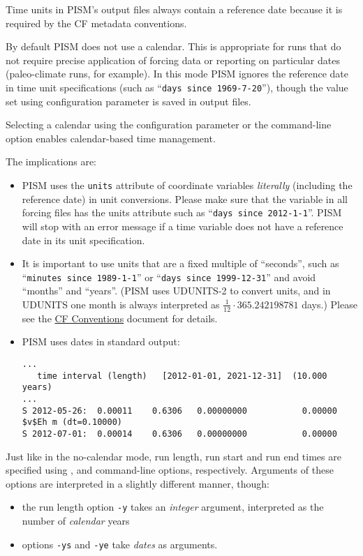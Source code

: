 Time units in PISM's output files always contain a reference date
because it is required by the CF metadata conventions.

By default PISM does not use a calendar. This is appropriate for runs that
do not require precise application of forcing data or reporting on
particular dates (paleo-climate runs, for example).
In this mode PISM ignores the reference date in time unit specifications
(such as ``\texttt{days since 1969-7-20}''), though the value set using
 configuration parameter is saved in
output files.

Selecting a calendar using the  configuration
parameter or the  command-line option enables calendar-based time management.

The implications are:
\begin{itemize}
\item PISM uses the \texttt{units} attribute of coordinate variables
  \emph{literally} (including the reference date) in unit conversions. Please
  make sure that the  variable in all forcing files has the
  units attribute such as ``\texttt{days since 2012-1-1}''. PISM will stop with
  an error message if a time variable does not have a reference date in its
  unit specification.
\item It is important to use units that are a fixed multiple of ``seconds'',
  such as ``\texttt{minutes since 1989-1-1}'' or ``\texttt{days since
    1999-12-31}'' and avoid ``months'' and ``years''. (PISM uses UDUNITS-2 to
  convert units, and in UDUNITS one month is always interpreted as
  $\frac{1}{12}\cdot 365.242198781$ days.) Please see the 
  \href{http://cf-pcmdi.llnl.gov/documents/cf-conventions/1.6/cf-conventions.html#time-coordinate}{CF
    Conventions} document for details.
\item PISM uses dates in standard output:
\begin{verbatim}
...
   time interval (length)   [2012-01-01, 2021-12-31]  (10.000 years)
...
S 2012-05-26:  0.00011    0.6306   0.00000000           0.00000
$v$Eh m (dt=0.10000)
S 2012-07-01:  0.00014    0.6306   0.00000000           0.00000
\end{verbatim}
\end{itemize}

Just like in the no-calendar mode, run length, run start and run end
times are specified using ,  and
 command-line options, respectively. Arguments of
these options are interpreted in a slightly different manner, though:
\begin{itemize}
\item the run length option \texttt{-y} takes an \emph{integer}
  argument, interpreted as the number of \emph{calendar} years
\item options \texttt{-ys} and \texttt{-ye} take \emph{dates} as arguments.
\end{itemize}

